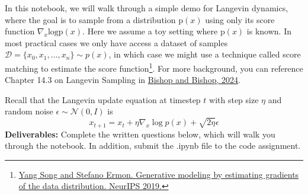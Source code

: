 \documentclass{article}
\begin{document}
In this notebook, we will walk through a simple demo for Langevin dynamics, where the goal is to sample from a distribution $\text{p}(x)$ using only its score function $\nabla_x \text{log} \text{p}(x)$. 
Here we assume a toy setting where $\text{p}(x)$ is known. 
In most practical cases we only have access a dataset of samples $\mathcal{D} = \{x_0, x_1, \ldots, x_n\} \sim p(x)$, in which case we might use a technique called score matching to estimate the score function\footnote{\href{https://papers.neurips.cc/paper\_files/paper/2019/hash/3001ef257407d5a371a96dcd947c7d93-Abstract.html}{Yang Song and Stefano Ermon. Generative modeling by estimating gradients of the data distribution. NeurIPS 2019.}}. 
For more background, you can reference Chapter 14.3 on Langevin Sampling in \href{https://www.bishopbook.com}{Bishop and Bishop, 2024}.

Recall that the Langevin update equation at timestep $t$ with step size $\eta$ and random noise $\epsilon \sim \mathcal{N}(0,I)$ is
\[
    x_{t+1} = x_t + \eta\nabla_x \log p(x) + \sqrt{2\eta}\epsilon
\]
\textbf{Deliverables:} Complete the written questions below, which will walk you through the notebook. In addition, submit the .ipynb file to the code assignment.
\end{document}
